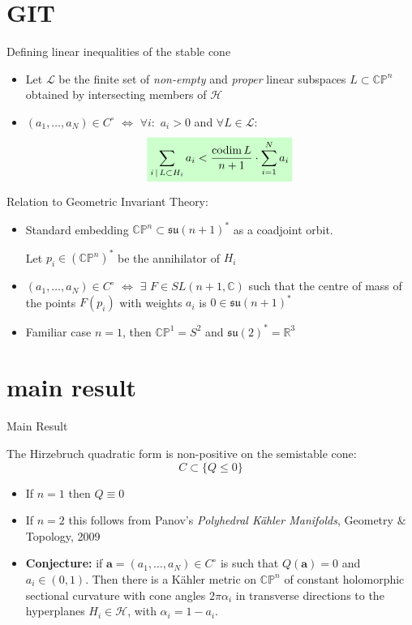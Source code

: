 \documentclass{beamer}
\newcommand{\C}{\mathbb{C}}
\newcommand{\R}{\mathbb{R}}
\newcommand{\CP}{\mathbb{CP}}
\newcommand{\mH}{\mathcal{H}}
\newcommand{\mL}{\mathcal{L}}
\newcommand{\ba}{\mathbf{a}}
\DeclareMathOperator{\codim}{codim}
\newcommand{\mathcolorbox}[2]{\colorbox{#1}{$\displaystyle #2$}}
\begin{document}
\section{GIT}
\begin{frame}{Defining linear inequalities of the stable cone}
	\begin{itemize}
		\item Let \(\mL\) be the finite set of \emph{non-empty} and \emph{proper} linear subspaces \(L \subset \CP^n\) obtained by intersecting members of \(\mH\)
		
		\item \((a_1, \ldots, a_N) \in C^{\circ}\) \(\iff\) \(\forall i:\) \(a_i > 0\)  and \(\forall L \in \mL:\)
		\[
		\mathcolorbox{green!20}{
			\sum_{i \,|\, L \subset H_i} a_i < \frac{\codim L}{n+1} \cdot \sum_{i=1}^{N} a_i 
		}
		\]
	\end{itemize}

Relation to Geometric Invariant Theory:

\begin{itemize}
	\item Standard embedding \(\CP^n \subset \mathfrak{su}(n+1)^*\) as a coadjoint orbit. 
	
	Let \(p_i \in (\CP^n)^*\) be the annihilator of \(H_i\)
	
	\item \((a_1, \ldots, a_N) \in C^{\circ}\) \(\iff\) \(\exists\) \(F \in SL(n+1, \C)\) such that the centre of mass of the points \(F(p_i)\) with weights \(a_i\) is \(0 \in \mathfrak{su}(n+1)^*\)
	
	\item Familiar case \(n=1\), then \(\CP^1 = S^2\) and \(\mathfrak{su}(2)^* = \R^3\)
\end{itemize}
\end{frame}

\section{main result}
\begin{frame}{Main Result}
	\begin{theorem}
		The Hirzebruch quadratic form is non-positive on the semistable cone:
		\[
		C \subset \{Q \leq 0\}
		\]
	\end{theorem}

\begin{itemize}
	\item If \(n=1\) then \(Q \equiv 0\)
	\item If \(n=2\) this follows from Panov's \emph{Polyhedral K\"ahler Manifolds}, Geometry \(\&\) Topology, 2009
	\item \textbf{Conjecture:} if \(\ba = (a_1, \ldots, a_N) \in C^{\circ}\) is such that \(Q(\ba) = 0\) and  \(a_i \in (0,1)\). Then there is a K\"ahler metric on \(\CP^n\) of constant holomorphic sectional curvature with cone angles \(2\pi\alpha_i\) in transverse directions to the hyperplanes \(H_i \in \mH\), with \(\alpha_i = 1-a_i\).
\end{itemize}
\end{frame}
\end{document}
